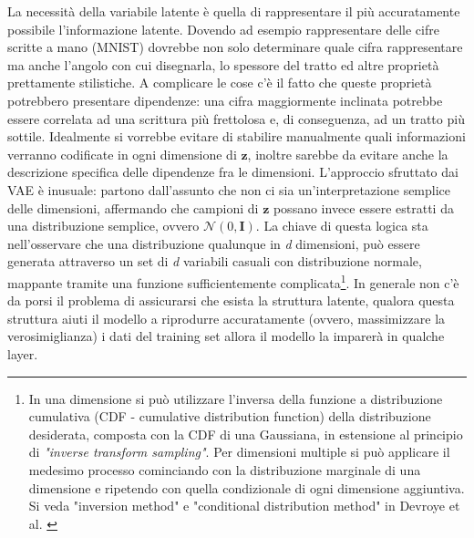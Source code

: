 La necessità della variabile latente è quella di rappresentare il più accuratamente possibile l'informazione latente. Dovendo ad esempio rappresentare delle cifre scritte a mano (MNIST) dovrebbe non solo determinare quale cifra rappresentare ma anche l'angolo con cui disegnarla, lo spessore del tratto ed altre proprietà prettamente stilistiche. A complicare le cose c'è il fatto che queste proprietà potrebbero presentare dipendenze: una cifra maggiormente inclinata potrebbe essere correlata ad una scrittura più frettolosa e, di conseguenza, ad un tratto più sottile. Idealmente si vorrebbe evitare di stabilire manualmente quali informazioni verranno codificate in ogni dimensione di $\boldsymbol{z}$, inoltre sarebbe da evitare anche la descrizione specifica delle dipendenze fra le dimensioni. L'approccio sfruttato dai VAE è inusuale: partono dall'assunto che non ci sia un'interpretazione semplice delle dimensioni, affermando che campioni di $\boldsymbol{z}$ possano invece essere estratti da una distribuzione semplice, ovvero $\mathcal{N}(0, \boldsymbol{I})$. La chiave di questa logica sta nell'osservare che una distribuzione qualunque in \textit{d} dimensioni, può essere generata attraverso un set di \textit{d} variabili casuali con distribuzione normale, mappante tramite una funzione sufficientemente complicata\footnote{In una dimensione si può utilizzare l'inversa della funzione a distribuzione cumulativa (CDF - cumulative distribution function) della distribuzione desiderata, composta con la CDF di una Gaussiana, in estensione al principio di \textit{"inverse transform sampling"}. Per dimensioni multiple si può applicare il medesimo processo cominciando con la distribuzione marginale di una dimensione e ripetendo con quella condizionale di ogni dimensione aggiuntiva. Si veda "inversion method" e "conditional distribution method" in Devroye et al. \cite{rvg}}. In generale non c'è da porsi il problema di assicurarsi che esista la struttura latente, qualora questa struttura aiuti il modello a riprodurre accuratamente (ovvero, massimizzare la verosimiglianza) i dati del training set allora il modello la imparerà in qualche layer.

